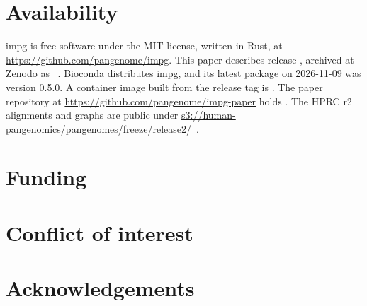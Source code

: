 \section{Availability}
\label{sec:availability}

impg is free software under the MIT license, written in Rust, at \url{https://github.com/pangenome/impg}.
This paper describes release , archived at Zenodo as ~\citep{Guarracino2026impg}.
Bioconda distributes impg, and its latest package on 2026-11-09 was version 0.5.0.
A container image built from the release tag is .
The paper repository at \url{https://github.com/pangenome/impg-paper} holds .
The HPRC r2 alignments and graphs are public under \url{s3://human-pangenomics/pangenomes/freeze/release2/}~\citep{HPRC2026resources}.

\section*{Funding}

\section*{Conflict of interest}

\section*{Acknowledgements}
